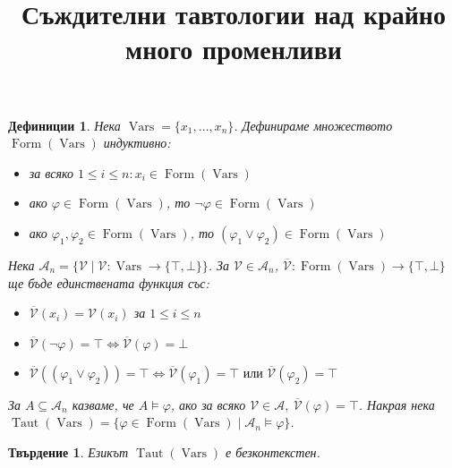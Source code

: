 \documentclass[a4paper]{article}
\newcommand{\vars}{\operatorname{Vars}}
\newcommand{\form}{\operatorname{Form}(\vars)}
\newcommand{\taut}{\operatorname{Taut}(\vars)}
\newcommand{\A}{\mathcal{A}}
\newcommand{\V}{\mathcal{V}}
\newcommand{\OV}{\overline{\V}}
\newtheorem*{definitions}{Дефиниции}
\newtheorem*{claim}{Твърдение}
\begin{document}
\title{Съждителни тавтологии над крайно много променливи}
\date{}
\maketitle
\begin{definitions}
    Нека $\vars = \{ x_1, \dots, x_n \}$.
    Дефинираме множеството $\form$ индуктивно:

    \begin{itemize}
        \item за всяко $1 \leq i \leq n : x_i \in \form$
        \item ако $\varphi \in \form$, то $\neg\varphi \in \form$
        \item ако $\varphi_1, \varphi_2 \in \form$, то $(\varphi_1 \lor \varphi_2) \in \form$
    \end{itemize}

    Нека $\A_n = \{ \V \mid \V : \vars \rightarrow \{ \top, \bot \} \}$.
    За $\V \in \A_n$, $\OV : \form \rightarrow \{ \top, \bot \}$ ще бъде единствената функция със:

    \begin{itemize}
        \item $\OV(x_i) = \V(x_i)$ за $1 \leq i \leq n$
        \item $\OV(\neg \varphi) = \top \iff \OV(\varphi) = \bot$
        \item $\OV((\varphi_1 \lor \varphi_2)) = \top \iff \OV(\varphi_1) = \top \text{ или } \OV(\varphi_2) = \top$
    \end{itemize}

    За $A \subseteq \A_n$ казваме, че $A \models \varphi$, ако за всяко $ \V \in \A, \: \OV(\varphi) = \top$.
    Накрая нека $\taut = \{ \varphi \in \form \mid \A_n \models \varphi \}$.
\end{definitions}

\begin{claim}
    Езикът $\taut$ е безконтекстен.
\end{claim}
\end{document}
